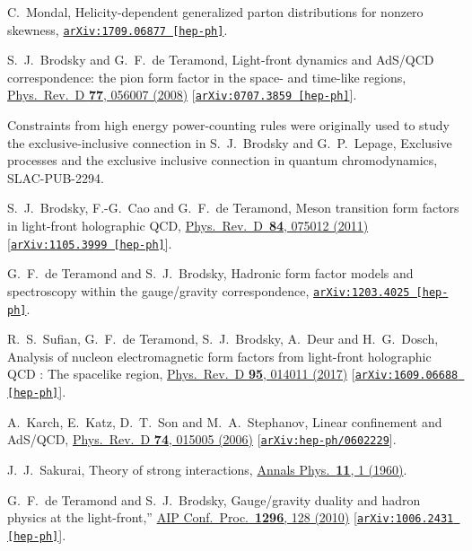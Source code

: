 \documentclass[aps,prd,preprint,groupedaddress]{revtex4-1}
\begin{document}
\begin{thebibliography}{99}
  
  C.~Mondal,
  Helicity-dependent generalized parton distributions for nonzero skewness,
  \href{https://arxiv.org/abs/1709.06877}{\tt arXiv:1709.06877 [hep-ph]}.
  

 S.~J.~Brodsky and G.~F.~de Teramond,
 Light-front dynamics and AdS/QCD correspondence: the pion form factor in the space- and time-like regions,
 \href{http://prd.aps.org/abstract/PRD/v77/i5/e056007}{ Phys.\ Rev.\  D {\bf 77}, 056007 (2008)}
 [\href{http://arXiv.org/abs/0707.3859}{\tt arXiv:0707.3859 [hep-ph]}].
 
 
 Constraints from high energy power-counting rules were originally used to study the exclusive-inclusive connection in 
  S.~J.~Brodsky and G.~P.~Lepage,
  Exclusive processes and the exclusive inclusive connection in quantum chromodynamics,
  SLAC-PUB-2294.


  S.~J.~Brodsky, F.-G.~Cao and G.~F.~de Teramond,
  Meson transition form factors in light-front holographic QCD,
  \href{http://prd.aps.org/abstract/PRD/v84/i7/e075012}{Phys.\ Rev.\ D\ {\bf 84}, 075012  (2011)}
  [\href{http://arXiv.org/abs/1105.3999}{\tt arXiv:1105.3999 [hep-ph]}].


  G.~F.~de Teramond and S.~J.~Brodsky,
  Hadronic form factor models and spectroscopy within the gauge/gravity correspondence,
  \href{http://arxiv.org/abs/arXiv:1203.4025}{\tt arXiv:1203.4025 [hep-ph]}.


  R.~S.~Sufian, G.~F.~de Teramond, S.~J.~Brodsky, A.~Deur and H.~G.~Dosch,
  Analysis of nucleon electromagnetic form factors from light-front holographic QCD : The spacelike region,
  \href{https://journals.aps.org/prd/abstract/10.1103/PhysRevD.95.014011}{Phys.\ Rev.\ D {\bf 95},  014011 (2017)}
  [\href{https://arxiv.org/abs/1609.06688}{\tt arXiv:1609.06688 [hep-ph]}].


  A.~Karch, E.~Katz, D.~T.~Son and M.~A.~Stephanov,
  Linear confinement and AdS/QCD,
 \href{http://prd.aps.org/abstract/PRD/v74/i1/e015005}{ Phys.\ Rev.\  D {\bf 74}, 015005 (2006)}
  [\href{http://arXiv.org/abs/hep-ph/0602229}{\tt arXiv:hep-ph/0602229}].


  J.~J.~Sakurai,
  Theory of strong interactions,
  \href{http://www.sciencedirect.com/science/article/pii/0003491660901263}{Annals Phys.\  {\bf 11}, 1 (1960)}.
  
 
  G.~F.~de Teramond and S.~J.~Brodsky,
  Gauge/gravity duality and hadron physics at the light-front,''
  \href{http://aip.scitation.org/doi/abs/10.1063/1.3523157}{AIP Conf.\ Proc.\  {\bf 1296}, 128 (2010)}
  [\href{https://arxiv.org/abs/1006.2431}{\tt arXiv:1006.2431 [hep-ph]}].  
  

\end{thebibliography}
\end{document}

